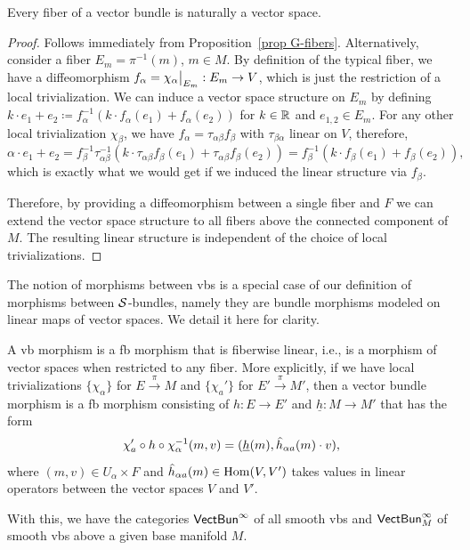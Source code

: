 \begin{prop}
    Every fiber of a vector bundle is naturally a vector space.
\end{prop}
\begin{proof}
    Follows immediately from Proposition~\ref{prop G-fibers}. Alternatively, consider a fiber $E_m=\pi^{-1}(m)$, $m\in M$. By definition of the typical fiber, we have a diffeomorphism $f_\alpha=\restr{\chi_\alpha}{E_m}:E_m\to V$, which is just the restriction of a local trivialization. We can induce a vector space structure on $E_m$ by defining $k\cdot e_1+e_2\coloneqq f_\alpha^{-1}(k\cdot f_\alpha(e_1)+f_\alpha(e_2))$ for $k\in \mathbb{R} $ and $e_{1,2}\in E_m$. For any other local trivialization $\chi_\beta$, we have $f_\alpha=\tau_{\alpha\beta}f_\beta$ with $\tau_{\beta\alpha}$ linear on $V$, therefore, 
    \[
    \alpha\cdot e_1+e_2=f_\beta^{-1}\tau_{\alpha\beta}^{-1}(k\cdot \tau_{\alpha\beta}f_\beta(e_1)+\tau_{\alpha\beta}f_\beta(e_2))=f_\beta^{-1}(k\cdot f_\beta(e_1)+f_\beta(e_2)),
    \] 
    which is exactly what we would get if we induced the linear structure via $f_\beta$.
    
    Therefore, by providing a diffeomorphism between a single fiber and $F$ we can extend the vector space structure to all fibers above the connected component of $M$. The resulting linear structure is independent of the choice of local trivializations.
\end{proof}

The notion of morphisms between \glspl{vb} is a special case of our definition of morphisms between $\mathcal{S}$-bundles, namely they are bundle morphisms modeled on linear maps of vector spaces. We detail it here for clarity.

\begin{defn}
    A \gls{vb} morphism is a \gls{fb} morphism that is fiberwise linear, i.e., is a morphism of vector spaces when restricted to any fiber. More explicitly, if we have  local trivializations $\{\chi_\alpha\}$ for $E\overset{\pi}{\to}M$ and $\{\chi_a'\}$ for $E'\overset{\pi}{\to}M'$, then a vector bundle morphism is a \gls{fb} morphism consisting of $h:E\to E'$ and $\underline{h}:M\to M'$ that has the form 
    \[\chi_a '\circ h \circ \chi_\alpha^{-1}(m,v)=(\underline{h}(m),\wh{h}_{\alpha a}(m)\cdot v),\]
    where $(m,v)\in U_\alpha\times F$ and $\wh{h}_{\alpha a}(m)\in \Hom(V,V')$ takes values in linear operators between the vector spaces $V$ and $V'$.

    With this, we have the categories $\mathsf{VectBun}^\infty $ of all smooth \glspl{vb} and $\mathsf{VectBun}^\infty_M$ of smooth \glspl{vb} above a given base manifold $M$.
\end{defn}


